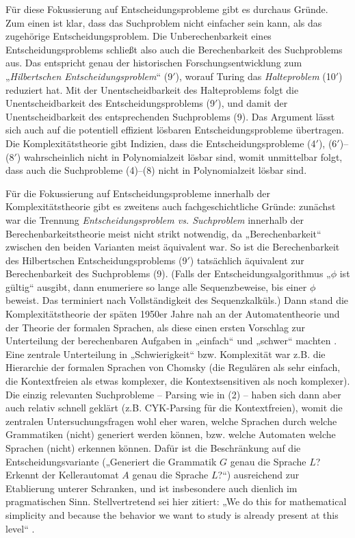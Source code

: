 Für diese Fokussierung auf Entscheidungsprobleme gibt es durchaus Gründe. Zum einen ist klar, dass das Suchproblem nicht einfacher sein kann, als das zugehörige Entscheidungsproblem. Die Unberechenbarkeit eines Entscheidungsproblems schließt also auch die Berechenbarkeit des Suchproblems aus. Das entspricht genau der historischen Forschungsentwicklung zum „\emph{Hilbertschen Entscheidungsproblem}“ (9$'$), worauf Turing das \emph{Halteproblem} (10$'$) reduziert hat. Mit der Unentscheidbarkeit des  Halteproblems folgt die Unentscheidbarkeit des Entscheidungsproblems (9$'$), und damit der Unentscheidbarkeit des entsprechenden Suchproblems (9). 
Das Argument lässt sich auch auf die potentiell effizient lösbaren Entscheidungsprobleme übertragen. Die Komplexitätstheorie gibt Indizien, dass die Entscheidungsprobleme (4$'$), (6$'$)–(8$'$) wahrscheinlich nicht in Polynomialzeit lösbar sind, womit unmittelbar folgt, dass auch die Suchprobleme (4)–(8) nicht in Polynomialzeit lösbar sind.

\pagebreak[3]
Für die Fokussierung auf Entscheidungsprobleme innerhalb der Komplexitätstheorie gibt es zweitens auch fachgeschichtliche Gründe: zunächst war die Trennung \emph{Entscheidungsproblem vs. Suchproblem} innerhalb der Berechenbarkeitstheorie meist nicht strikt notwendig, da „Berechenbarkeit“ zwischen den beiden Varianten meist äquivalent war. So ist die Berechenbarkeit des Hilbertschen Entscheidungsproblems (9$'$) tatsächlich äquivalent zur Berechenbarkeit des Suchproblems (9). (Falls der Entscheidungsalgorithmus „$\phi$ ist gültig“ ausgibt, dann enumeriere so lange alle Sequenzbeweise, bis einer $\phi$ beweist. Das terminiert nach Vollständigkeit des Sequenzkalküls.)
Dann stand die Komplexitätstheorie der späten 1950er Jahre nah an der Automatentheorie und der Theorie der formalen Sprachen, als diese einen ersten Vorschlag zur Unterteilung 
 der berechenbaren Aufgaben in „einfach“ und „schwer“ machten \parencite[vgl.][]{koucky_automata_2023}. Eine zentrale Unterteilung in „Schwierigkeit“ bzw. Komplexität war z.B. die Hierarchie der formalen Sprachen von Chomsky (die Regulären als sehr einfach, die Kontextfreien als etwas komplexer, die Kontextsensitiven als noch komplexer). 
Die einzig relevanten Suchprobleme – Parsing wie in (2) – haben sich dann aber auch relativ schnell geklärt (z.B. CYK-Parsing für die Kontextfreien), womit die zentralen Untersuchungsfragen wohl eher waren, welche Sprachen durch welche Grammatiken (nicht) generiert werden können, bzw. welche Automaten welche Sprachen (nicht) erkennen können. Dafür ist die Beschränkung auf die Entscheidungsvariante („Generiert die Grammatik $G$ genau die Sprache $L$? Erkennt der Kellerautomat $A$ genau die Sprache $L$?“) ausreichend zur Etablierung unterer Schranken, und ist insbesondere auch dienlich im pragmatischen Sinn. Stellvertretend sei hier \citeauthor{kozen_automata_1997} zitiert: „We do this for mathematical simplicity and because the behavior we want to study is already present at this level“ \parencite*[7]{kozen_automata_1997}.

